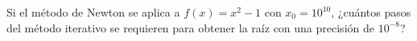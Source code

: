 \vspace{1cm}
\begin{problema}
Si el método de Newton se aplica a \(f(x)=x^2-1\) con \(x_0=10^{10}\), ¿cuántos pasos del método iterativo se requieren para obtener la raíz con una precisión de \(10^{-8}\)?
\end{problema}
